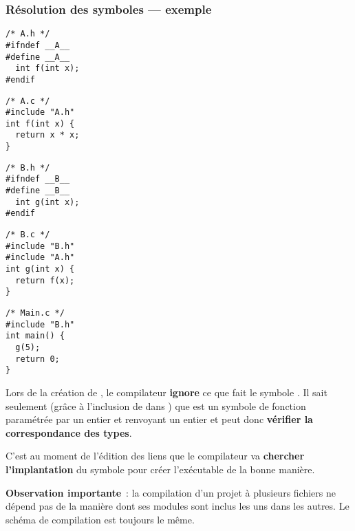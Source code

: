 \begin{frame}[fragile]
\frametitle{Résolution des symboles --- exemple}
\begin{minipage}[c]{.18\textwidth}
\begin{lstlisting}[frame=single,numbers=none,basicstyle=\scriptsize\tt]
/* A.h */
#ifndef __A__
#define __A__
  int f(int x);
#endif
\end{lstlisting}
\end{minipage}
\enspace
\begin{minipage}[c]{.18\textwidth}
\begin{lstlisting}[frame=single,numbers=none,basicstyle=\scriptsize\tt]
/* A.c */
#include "A.h"
int f(int x) {
  return x * x;
}
\end{lstlisting}
\end{minipage}
\enspace
\begin{minipage}[c]{.18\textwidth}
\begin{lstlisting}[frame=single,numbers=none,basicstyle=\scriptsize\tt]
/* B.h */
#ifndef __B__
#define __B__
  int g(int x);
#endif
\end{lstlisting}
\end{minipage}
\enspace
\begin{minipage}[c]{.18\textwidth}
\begin{lstlisting}[frame=single,numbers=none,basicstyle=\scriptsize\tt]
/* B.c */
#include "B.h"
#include "A.h"
int g(int x) {
  return f(x);
}
\end{lstlisting}
\end{minipage}
\enspace
\begin{minipage}[c]{.17\textwidth}
\begin{lstlisting}[frame=single,numbers=none,basicstyle=\scriptsize\tt]
/* Main.c */
#include "B.h"
int main() {
  g(5);
  return 0;
}
\end{lstlisting}
\end{minipage}

Lors de la création de , le compilateur {\bf ignore} ce que fait
le symbole . Il sait seulement (grâce à l'inclusion de 
dans ) que  est un symbole de fonction paramétrée par un
entier et renvoyant un entier et peut donc {\bf vérifier la correspondance
des types}.
\medskip

C'est au moment de l'édition des liens que le compilateur va
{\bf chercher l'implantation} du symbole  pour créer l'exécutable
de la bonne manière.
\bigskip

{\bf Observation importante}~: la compilation d'un projet à plusieurs
fichiers ne dépend pas de la manière dont ses modules sont inclus les
uns dans les autres. Le schéma de compilation est toujours le même.
\end{frame}

